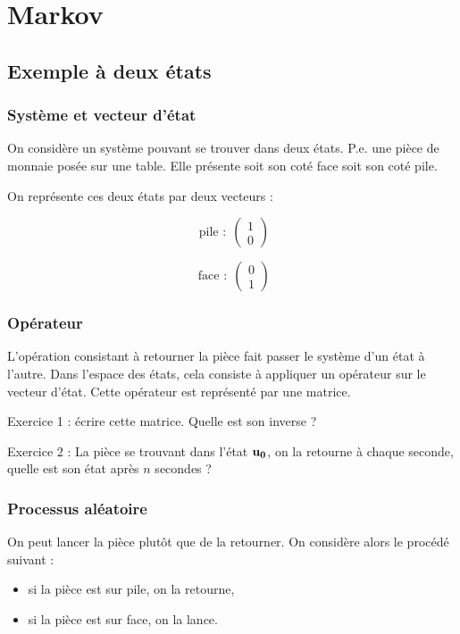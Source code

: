 \newpage
\section{Markov}
%
\subsection{Exemple à deux états}
\subsubsection{Système et vecteur d'état}
On considère un système pouvant se trouver dans deux états. P.e. une pièce de monnaie posée sur une table. Elle présente soit son coté face soit son coté pile.

On représente ces deux états par deux vecteurs : 

\begin{minipage}[c]{.45\linewidth}
\[
\text{ pile :} \ \ 
\left( \begin{array}{ c }
 1 \\ 0
\end{array} \right)
\]
\end{minipage}
\hfill
\begin{minipage}[c]{.45\linewidth}
\[
\text{ face :} \ \ 
\left( \begin{array}{ c }
 0 \\ 1
\end{array} \right)
\]
\end{minipage}

\subsubsection{Opérateur}

L'opération consistant à retourner la pièce fait passer le système d'un état à l'autre. Dans l'espace des états, cela consiste à appliquer un opérateur sur le vecteur d'état. Cette opérateur est représenté par une matrice.

\so Exercice 1 : écrire cette matrice. Quelle est son inverse ?

\so Exercice 2 : La pièce se trouvant dans l'état $\bf u_0$, on la retourne à chaque seconde, quelle est son état après $n$ secondes ?

\subsubsection{Processus aléatoire}
On peut lancer la pièce plutôt que de la retourner. On considère alors le procédé suivant :
\begin{itemize}[leftmargin=1cm, label=, itemsep=1pt]
\item si la pièce est sur pile, on la retourne,
\item si la pièce est sur face, on la lance.
\end{itemize}

